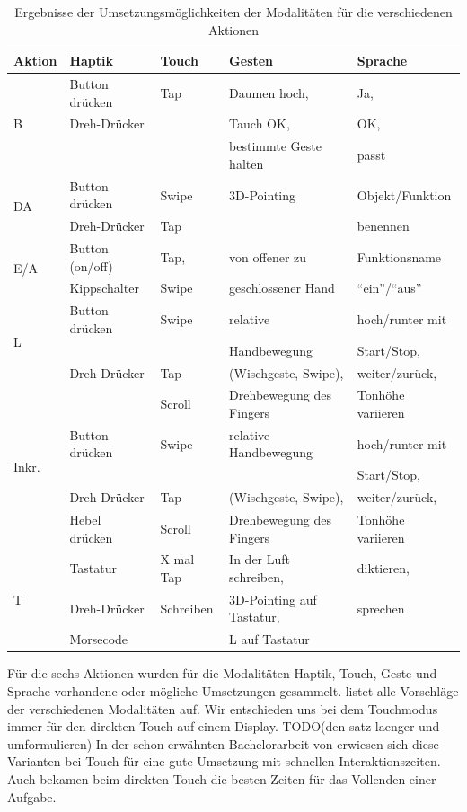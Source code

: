 \begin{table}[ht]
	\centering
	\begin{tabular}{|l|l|l|l|l|}
		\hline
		Aktion & Haptik & Touch & Gesten 			& Sprache\\
		\hline
				\multirow {3}{*}{B}
					& Button drücken		& Tap 				& Daumen hoch, 									& Ja,\\
					& Dreh-Drücker			& 						& Tauch OK, 										& OK,\\
					& 									& 						& bestimmte Geste halten 				& passt\\
		\hline
				\multirow{2}{*}{DA}
					& Button drücken		& Swipe  			& 3D-Pointing 								& Objekt/Funktion \\
					& Dreh-Drücker			& Tap					& 														& benennen \\		
		\hline
				\multirow{2}{*}{E/A}
					& Button (on/off)		& Tap,  			& von offener zu 								& Funktionsname\\
					& Kippschalter			& Swipe				& geschlossener Hand						& "`ein"'/"`aus"'\\
		\hline
				\multirow{3}{*}{L}
					& Button drücken		& Swipe				& relative  										& hoch/runter mit\\
					& 									& 						& Handbewegung									& Start/Stop,\\
					& Dreh-Drücker			& Tap 				& (Wischgeste, Swipe), 					& weiter/zurück,\\
					& 									& Scroll			& Drehbewegung des Fingers 			& Tonhöhe variieren\\		
		\hline
				\multirow{3}{*}{Inkr.}		
					& Button drücken		& Swipe				& relative Handbewegung 				& hoch/runter mit\\
					& 									& 						& 															& Start/Stop,\\
					& Dreh-Drücker			& Tap 				& (Wischgeste, Swipe), 					& weiter/zurück,\\
					& Hebel drücken			& Scroll			& Drehbewegung des Fingers			& Tonhöhe variieren\\					
		\hline
				\multirow{3}{*}{T}
					& Tastatur					& X mal Tap 	& In der Luft schreiben, 				& diktieren,\\
					& Dreh-Drücker			& Schreiben		& 3D-Pointing auf Tastatur,			& sprechen\\		
					& Morsecode					& 						& L auf Tastatur								&  \\	
		\hline			
  \end{tabular}
	\caption{Ergebnisse der Umsetzungsmöglichkeiten der Modalitäten für die verschiedenen Aktionen}
	\label{tab:table1}
\end{table}
Für die sechs Aktionen wurden für die Modalitäten Haptik, Touch, Geste und Sprache vorhandene oder mögliche Umsetzungen gesammelt. 
 listet alle Vorschläge der verschiedenen Modalitäten auf.
Wir entschieden uns bei dem Touchmodus immer für den direkten Touch auf einem Display. TODO(den satz laenger und umformulieren) 
In der schon erwähnten Bachelorarbeit von \citet{stracke2014touch} erwiesen sich diese Varianten bei Touch für eine gute Umsetzung mit schnellen Interaktionszeiten. 
Auch \citet{Rumelin:2013} bekamen beim direkten Touch die besten Zeiten für das Vollenden einer Aufgabe.

